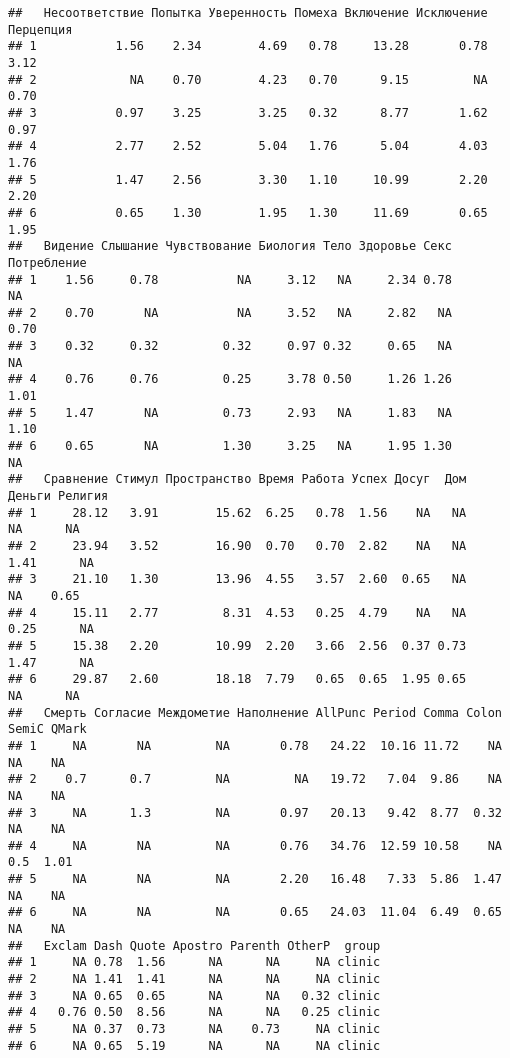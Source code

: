 \documentclass[
]{article}
\begin{document}
\begin{verbatim}
##   Несоответствие Попытка Уверенность Помеха Включение Исключение Перцепция
## 1           1.56    2.34        4.69   0.78     13.28       0.78      3.12
## 2             NA    0.70        4.23   0.70      9.15         NA      0.70
## 3           0.97    3.25        3.25   0.32      8.77       1.62      0.97
## 4           2.77    2.52        5.04   1.76      5.04       4.03      1.76
## 5           1.47    2.56        3.30   1.10     10.99       2.20      2.20
## 6           0.65    1.30        1.95   1.30     11.69       0.65      1.95
##   Видение Слышание Чувствование Биология Тело Здоровье Секс Потребление
## 1    1.56     0.78           NA     3.12   NA     2.34 0.78          NA
## 2    0.70       NA           NA     3.52   NA     2.82   NA        0.70
## 3    0.32     0.32         0.32     0.97 0.32     0.65   NA          NA
## 4    0.76     0.76         0.25     3.78 0.50     1.26 1.26        1.01
## 5    1.47       NA         0.73     2.93   NA     1.83   NA        1.10
## 6    0.65       NA         1.30     3.25   NA     1.95 1.30          NA
##   Сравнение Стимул Пространство Время Работа Успех Досуг  Дом Деньги Религия
## 1     28.12   3.91        15.62  6.25   0.78  1.56    NA   NA     NA      NA
## 2     23.94   3.52        16.90  0.70   0.70  2.82    NA   NA   1.41      NA
## 3     21.10   1.30        13.96  4.55   3.57  2.60  0.65   NA     NA    0.65
## 4     15.11   2.77         8.31  4.53   0.25  4.79    NA   NA   0.25      NA
## 5     15.38   2.20        10.99  2.20   3.66  2.56  0.37 0.73   1.47      NA
## 6     29.87   2.60        18.18  7.79   0.65  0.65  1.95 0.65     NA      NA
##   Смерть Согласие Междометие Наполнение AllPunc Period Comma Colon SemiC QMark
## 1     NA       NA         NA       0.78   24.22  10.16 11.72    NA    NA    NA
## 2    0.7      0.7         NA         NA   19.72   7.04  9.86    NA    NA    NA
## 3     NA      1.3         NA       0.97   20.13   9.42  8.77  0.32    NA    NA
## 4     NA       NA         NA       0.76   34.76  12.59 10.58    NA   0.5  1.01
## 5     NA       NA         NA       2.20   16.48   7.33  5.86  1.47    NA    NA
## 6     NA       NA         NA       0.65   24.03  11.04  6.49  0.65    NA    NA
##   Exclam Dash Quote Apostro Parenth OtherP  group
## 1     NA 0.78  1.56      NA      NA     NA clinic
## 2     NA 1.41  1.41      NA      NA     NA clinic
## 3     NA 0.65  0.65      NA      NA   0.32 clinic
## 4   0.76 0.50  8.56      NA      NA   0.25 clinic
## 5     NA 0.37  0.73      NA    0.73     NA clinic
## 6     NA 0.65  5.19      NA      NA     NA clinic
\end{verbatim}
\end{document}
